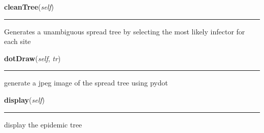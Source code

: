     \label{Epigrass:spread:Spread:cleanTree}

    \vspace{0.5ex}

    \begin{boxedminipage}{\textwidth}

    \raggedright \textbf{cleanTree}(\textit{self})

    \vspace{-1.5ex}

    \rule{\textwidth}{0.5\fboxrule}
    Generates a unambiguous spread tree by selecting the most likely 
    infector for each site

    \vspace{1ex}

    \end{boxedminipage}

    \label{Epigrass:spread:Spread:dotDraw}

    \vspace{0.5ex}

    \begin{boxedminipage}{\textwidth}

    \raggedright \textbf{dotDraw}(\textit{self}, \textit{tr})

    \vspace{-1.5ex}

    \rule{\textwidth}{0.5\fboxrule}
    generate a jpeg image of the spread tree using pydot

    \vspace{1ex}

    \end{boxedminipage}

    \label{Epigrass:spread:Spread:display}

    \vspace{0.5ex}

    \begin{boxedminipage}{\textwidth}

    \raggedright \textbf{display}(\textit{self})

    \vspace{-1.5ex}

    \rule{\textwidth}{0.5\fboxrule}
    display the epidemic tree

    \vspace{1ex}

    \end{boxedminipage}

